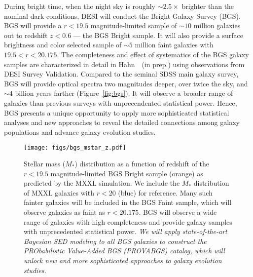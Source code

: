 During bright time, when the night sky is roughly ${\sim}2.5\times$ brighter
than the nominal dark conditions, DESI will conduct the Bright Galaxy Survey
(BGS). 
BGS will provide a $r < 19.5$ magnitude-limited sample of ${\sim}10$ million
galaxies out to redshift $z < 0.6$ --- the BGS Bright sample. 
It will also provide a surface brightness and color selected sample of 
${\sim}5$ million faint galaxies with $19.5 < r < 20.175$. 
The completeness and effect of systematics of the BGS galaxy samples are
characterized in detail in Hahn~\etal~(in prep.) using observations from
DESI Survey Validation. 
Compared to the seminal SDSS main galaxy survey, BGS will provide optical
spectra two magnitudes deeper, over twice the sky, and ${\sim}4$ billion years
farther (Figure~\ref{fig:bgs}). 
It will observe a broader range of galaxies than previous surveys with
unprecendented statistical power. 
Hence, BGS presents a unique opportunity to apply more sophisticated statistical
analyses and new approaches to reveal the detailed connections among galaxy
populations and  advance galaxy evolution studies. 

\begin{figure}
\begin{center}
    \texttt{[image: figs/bgs\_mstar\_z.pdf]}
    \caption{
        Stellar mass ($M_*$) distribution as a function of redshift of the $r < 19.5$
        magnitude-limited BGS Bright sample (orange) as predicted by the MXXL
        simulation. 
        We include the $M_*$ distribution of MXXL galaxies with $r < 20$ (blue)
        for reference.
        Many such fainter galaxies will be included in the BGS Faint sample,
        which will observe galaxies as faint as $r < 20.175$. 
        BGS will observe a wide range of galaxies with high completeness and
        provide galaxy samples with unprecedented statistical power.
        \emph{We will apply state-of-the-art Bayesian SED modeling to all BGS
        galaxies to construct the PRObabilistic Value-Added BGS (PROVABGS)
        catalog, which will unlock new and more sophisticated approaches to
        galaxy evolution studies.}}\label{fig:bgs_mstar}
\end{center}
\end{figure}

